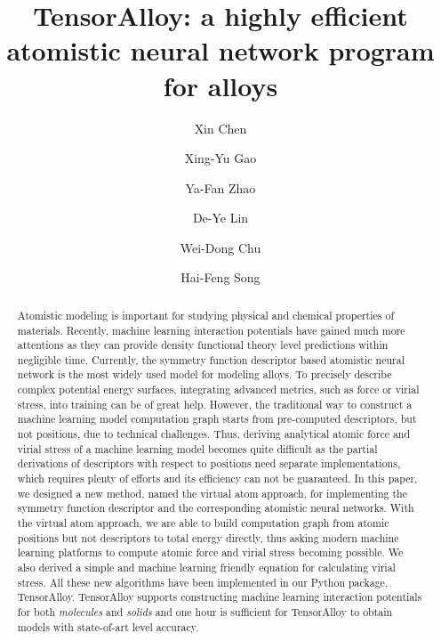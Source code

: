 \documentclass[preprint]{revtex4-2}
\begin{document}
\title{
    TensorAlloy: a highly efficient atomistic neural network program for alloys
}
\author{Xin Chen}
\author{Xing-Yu Gao}
\author{Ya-Fan Zhao}
\author{De-Ye Lin}
\author{Wei-Dong Chu}
\author{Hai-Feng Song}


\begin{abstract}
Atomistic modeling is important for studying physical and chemical properties of
materials. Recently, machine learning interaction potentials have gained much 
more attentions as they can provide density functional theory level predictions 
within negligible time. Currently, the symmetry function descriptor based 
atomistic neural network is the most widely used model for modeling alloys. 
To precisely describe complex potential energy surfaces, integrating advanced 
metrics, such as force or virial stress, into training can be of great help. 
However, the traditional way to construct a 
machine learning model computation graph starts from pre-computed descriptors, 
but not positions, due to technical challenges. Thus, deriving analytical atomic 
force and virial stress of a machine learning model becomes quite difficult as 
the partial derivations of descriptors with respect to positions need separate 
implementations, which requires plenty of efforts and its efficiency can not be 
guaranteed.
In this paper, we designed a new method, named the virtual atom approach, for 
implementing the symmetry function descriptor and the corresponding atomistic 
neural networks. With the virtual atom approach, we are able to build 
computation graph from atomic positions \textemdash but not descriptors 
\textemdash to total energy directly, thus asking modern machine learning 
platforms to compute atomic force and virial stress becoming possible. We also 
derived a simple and machine learning friendly equation for calculating virial 
stress. All these new algorithms have been implemented in our Python package, 
TensorAlloy. TensorAlloy supports constructing machine learning interaction 
potentials for both \textit{molecules} and \textit{solids} and one hour is 
sufficient for TensorAlloy to obtain models with state-of-art level accuracy.
\end{abstract}

\maketitle
\end{document}
